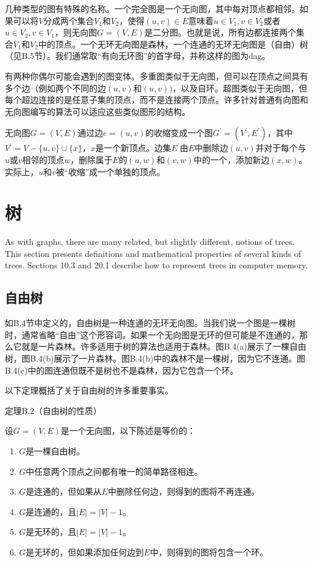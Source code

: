 \documentclass[lang=cn,newtx,10pt,scheme=chinese]{elegantbook}
\begin{document}
几种类型的图有特殊的名称。一个完全图是一个无向图，其中每对顶点都相邻。如果可以将$V$分成两个集合$V_1$和$V_2$，使得$(u,v)\in E$意味着$u\in V_1,v\in V_2$或者$u\in V_2,v\in V_1$，则无向图$G=(V,E)$是二分图。也就是说，所有边都连接两个集合$V_1$和$V_2$中的顶点。一个无环无向图是森林，一个连通的无环无向图是（自由）树（见B.5节）。我们通常取“有向无环图”的首字母，并称这样的图为dag。

有两种你偶尔可能会遇到的图变体。多重图类似于无向图，但可以在顶点之间具有多个边（例如两个不同的边$(u,v)$和$(u,v))$，以及自环。超图类似于无向图，但每个超边连接的是任意子集的顶点，而不是连接两个顶点。许多针对普通有向图和无向图编写的算法可以适应这些类似图形的结构。

无向图$G=(V,E)$通过边$e=(u,v)$的收缩变成一个图$G^{\prime}=\left(V^{\prime},E^{\prime}\right)$，其中$V^{\prime}=V-\{u,v\}\cup\{x\}$，$x$是一个新顶点。边集$E^{\prime}$由$E$中删除边$(u,v)$并对于每个与$u$或$v$相邻的顶点$w$，删除属于$E$的$(u,w)$和$(v,w)$中的一个，添加新边$(x,w)$。实际上，$u$和$v$被“收缩”成一个单独的顶点。

\section{树}

As with graphs, there are many related, but slightly different, notions of trees. This section presents definitions and mathematical properties of several kinds of trees. Sections 10.3 and 20.1 describe how to represent trees in computer memory.

\subsection{自由树}

如B.4节中定义的，自由树是一种连通的无环无向图。当我们说一个图是一棵树时，通常省略“自由”这个形容词。如果一个无向图是无环的但可能是不连通的，那么它就是一片森林。许多适用于树的算法也适用于森林。图B.4(a)展示了一棵自由树，图B.4(b)展示了一片森林。图B.4(b)中的森林不是一棵树，因为它不连通。图B.4(c)中的图连通但既不是树也不是森林，因为它包含一个环。

以下定理概括了关于自由树的许多重要事实。

定理B.2（自由树的性质）

设$G=(V,E)$是一个无向图，以下陈述是等价的：

\begin{enumerate}
\item $G$是一棵自由树。
\item $G$中任意两个顶点之间都有唯一的简单路径相连。
\item $G$是连通的，但如果从$E$中删除任何边，则得到的图将不再连通。
\item $G$是连通的，且$|E|=|V|-1$。
\item $G$是无环的，且$|E|=|V|-1$。
\item $G$是无环的，但如果添加任何边到$E$中，则得到的图将包含一个环。
\end{enumerate}
\end{document}
